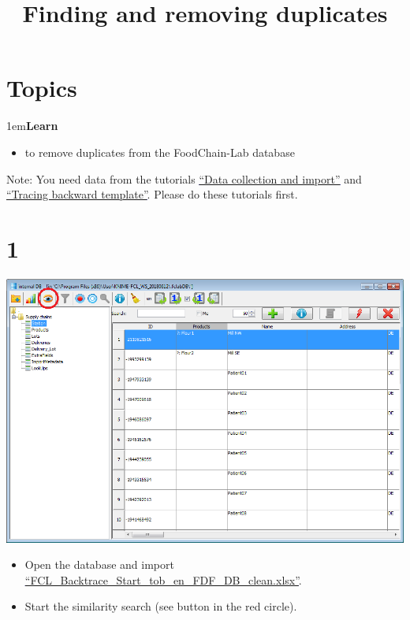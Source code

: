 \documentclass[10pt]{beamer}
\title{Finding and removing duplicates}
\date{}
\begin{document}
\maketitle

\section{Topics}
\begin{frame}
\leftskip1em\textbf{Learn}
	\begin{itemize}
		\item to remove duplicates from the FoodChain-Lab database
	\end{itemize}
\vspace*{\fill}
Note: You need data from the tutorials \textcolor{blue}{\underline{\href{https://foodrisklabs.bfr.bund.de/data-collection-and-import/}{``Data collection and import''}}} and \textcolor{blue}{\underline{\href{https://foodrisklabs.bfr.bund.de/templatebacktracing/}{``Tracing backward template''}}}. Please do these tutorials first.
\end{frame}

\section{1}
\begin{frame}
	\begin{center}
			\includegraphics[height=0.6\textheight]{1.png}
	\end{center}
	\begin{itemize}
		\item Open the database and import \textcolor{blue}{\underline{\href{https://github.com/SiLeBAT/BfROpenLabResources/raw/master/GitHubPages/documents/FCL\_Finding\_And\_Removing\_Duplicates/FCL\_Backtrace\_Start\_tob\_en\_FDF\_DB\_clean.xlsx}{``FCL\_Backtrace\_Start\_tob\_en\_FDF\_DB\_clean.xlsx''}}}.
		\item Start the similarity search (see button in the red circle).
	\end{itemize}
\end{frame}
\end{document}
